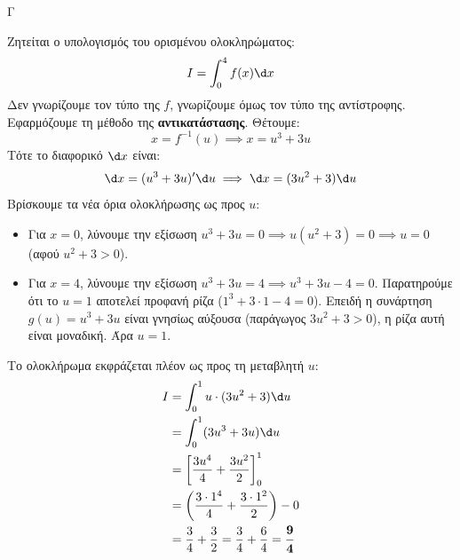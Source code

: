 \begin{thema}{Γ}
\begin{erwthma}
\item Ζητείται ο υπολογισμός του ορισμένου ολοκληρώματος:
\[ I = \int_0^4 f(x) \d x \]
Δεν γνωρίζουμε τον τύπο της $f$, γνωρίζουμε όμως τον τύπο της αντίστροφης.
Εφαρμόζουμε τη μέθοδο της \textbf{αντικατάστασης}. Θέτουμε:
\[ x = f^{-1}(u) \implies x = u^3 + 3u \]
Τότε το διαφορικό $\d x$ είναι:
\[ \d x = (u^3 + 3u)' \d u \implies \d x = (3u^2 + 3) \d u \]
Βρίσκουμε τα νέα όρια ολοκλήρωσης ως προς $u$:
\begin{itemize}
    \item Για $x = 0$, λύνουμε την εξίσωση $u^3 + 3u = 0 \implies u(u^2 + 3) = 0 \implies u = 0$ (αφού $u^2+3 > 0$).
    \item Για $x = 4$, λύνουμε την εξίσωση $u^3 + 3u = 4 \implies u^3 + 3u - 4 = 0$.
    Παρατηρούμε ότι το $u=1$ αποτελεί προφανή ρίζα ($1^3 + 3\cdot 1 - 4 = 0$). Επειδή η συνάρτηση $g(u) = u^3 + 3u$ είναι γνησίως αύξουσα (παράγωγος $3u^2+3>0$), η ρίζα αυτή είναι μοναδική. Άρα $u=1$.
\end{itemize}
Το ολοκλήρωμα εκφράζεται πλέον ως προς τη μεταβλητή $u$:
\begin{align*}
I &= \int_0^1 u \cdot (3u^2 + 3) \d u \\
&= \int_0^1 (3u^3 + 3u) \d u \\
&= \left[ \frac{3u^4}{4} + \frac{3u^2}{2} \right]_0^1 \\
&= \left( \frac{3 \cdot 1^4}{4} + \frac{3 \cdot 1^2}{2} \right) - 0 \\
&= \frac{3}{4} + \frac{3}{2} = \frac{3}{4} + \frac{6}{4} = \boldsymbol{\frac{9}{4}}
\end{align*}
\end{erwthma}
\end{thema}

